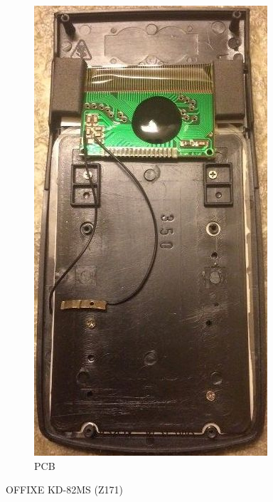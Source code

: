 \begin{figure}
\begin{subfigure}[b]{.5\linewidth}
   \centering\includegraphics{offixe/7019561509344433257}%
		\caption{PCB}\label{fig:OFFIXEPCB}
	\end{subfigure}
	\caption{OFFIXE KD-82MS (Z171)}\label{fig:OFFIXEKD82MS}
\end{figure}

